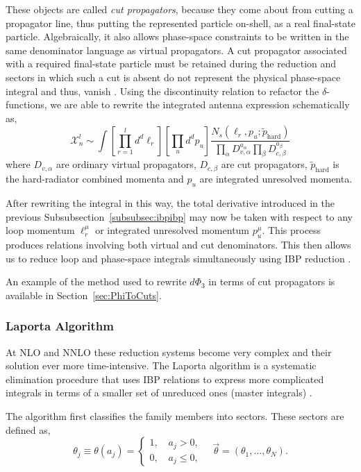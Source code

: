 These objects are called \textit{cut propagators}, because they come about from 
cutting a propagator line, thus putting the represented particle on-shell, as a 
real final-state particle. Algebraically, it also allows phase-space constraints to 
be written in the same denominator language as virtual propagators. 
A cut propagator associated with a required final-state particle must be retained 
during the reduction and sectors in which such a cut is absent do not represent the
physical phase-space integral and thus, vanish \cite{GehrmannDeRidder0311276}.
Using the discontinuity 
relation to refactor the $\delta$-functions, we are able to rewrite the integrated 
antenna expression schematically as,
\begin{equation}
    \mathcal X_n^l\sim \int\left[\prod_{r=1}^ld^d\ell_r\right]\left[\prod_u d^dp_u\right]\frac{N_s\!\left(\ell_r,p_u;\tilde p_\text{hard}\right)}{\prod_\alpha D_{v,\alpha}^{a_\alpha}\prod_\beta D_{c,\beta}^{a_\beta}}
\end{equation}
where $D_{v,\alpha}$ are ordinary virtual propagators, $D_{c,\beta}$ are cut propagators,
$\tilde p_\text{hard}$ is the hard-radiator combined momenta and
$p_u$ are integrated unresolved momenta.

After rewriting the integral in this way, the total derivative introduced in the 
previous Subsubsection~\ref{subsubsec:ibpibp} may now be taken with respect to any loop 
momentum $\ell_r^\mu$ or integrated unresolved momentum $p_u^\mu$. This process produces
relations involving 
both virtual and cut denominators. This then allows us to reduce loop and 
phase-space integrals simultaneously using IBP reduction 
\cite{GehrmannDeRidder0311276,Anastasiou:2002yz}.

An example of the method used to rewrite $d\Phi_3$ in terms of cut propagators 
is available in Section~\ref{sec:PhiToCuts}.

\subsubsection{Laporta Algorithm}

At NLO and NNLO these reduction systems become very complex and their solution ever 
more time-intensive. The Laporta algorithm is a systematic elimination procedure that 
uses IBP relations to express more complicated integrals in terms of a smaller set 
of unreduced ones (master integrals) \cite{Laporta:2000dsw}.

The algorithm first classifies the family members into sectors. These 
sectors are defined as,
\begin{equation}
    \theta_j\equiv\theta(a_j) = 
    \begin{cases}
        1,\quad a_j>0,\\
        0,\quad a_j\leq 0,
    \end{cases}
    \quad \vec\theta=(\theta_1,...,\theta_N).
\end{equation}

